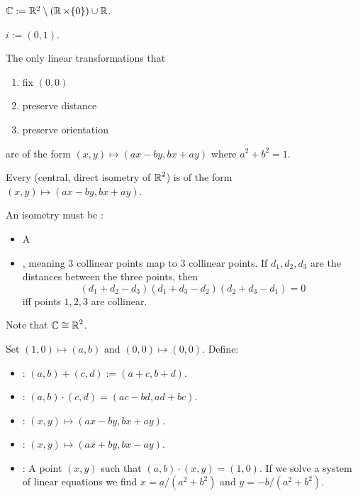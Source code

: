 \begin{definition}
$\operatorname{\mathbb{C}} := \mathbb{R}^2 \setminus (\operatorname{\mathbb{R}} \times \{0\}) \cup \operatorname{\mathbb{R}}$.
\end{definition}

\begin{definition}
    $i := (0,1)$.
\end{definition}

\begin{theorem}
    The only linear transformations that
    \begin{enumerate}
        \item fix $(0,0)$
        \item preserve distance
        \item preserve orientation
    \end{enumerate}
    are of the form $(x,y) \mapsto (ax - by, bx + ay)$ where $a^2 + b^2 = 1$.
\end{theorem}

\noindent
Every  (central, direct isometry of $\operatorname{\mathbb{R}}^2$)
is of the form $(x,y) \mapsto (ax-by, bx+ay)$.

An isometry must be :
\begin{itemize}
    \item A  
    \item {}, meaning $3$ collinear points map to $3$ collinear points.
    If $d_1, d_2, d_3$ are the distances between the three points, then
    \[ (d_1 + d_2 - d_3)(d_1 + d_3 - d_2)(d_2 + d_3 - d_1) = 0 \]
    iff points $1,2,3$ are collinear.
\end{itemize}

\noindent
Note that $\operatorname{\mathbb{C}} \cong \operatorname{\mathbb{R}}^2$.

Set $(1,0) \mapsto (a,b)$ and $(0,0) \mapsto (0,0)$.
Define:
\begin{itemize}
    \item {}: $(a,b) + (c,d) := (a+c, b+d)$.
    \item {}: $(a,b) \cdot (c,d) = (ac - bd, ad + bc)$.
    \item {}: $(x,y) \mapsto (ax - by, bx + ay)$.
    \item {}: $(x,y) \mapsto (ax + by, bx - ay)$.
    \item {}: A point $(x,y)$ such that $(a,b) \cdot (x,y) = (1,0)$.
    If we solve a system of linear equations we find $x = a/(a^2 + b^2)$ and $y = -b/(a^2+b^2)$.
\end{itemize}

%
